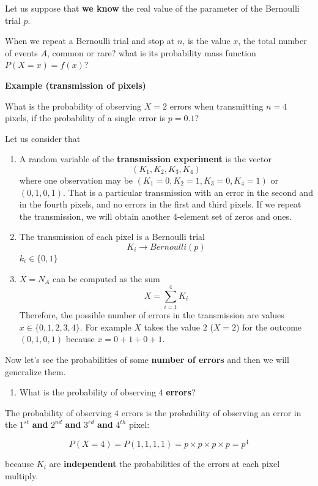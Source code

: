 \documentclass[
]{book}
\providecommand{\tightlist}{%
  \setlength{\itemsep}{0pt}\setlength{\parskip}{0pt}}
\begin{document}
Let us suppose that \textbf{we know} the real value of the parameter of the Bernoulli trial \(p\).

When we repeat a Bernoulli trial and stop at \(n\), is the value \(x\), the total number of events \(A\), common or rare? what is its probability mass function \(P(X=x)=f(x)\)?

\textbf{Example (transmission of pixels)}

What is the probability of observing \(X=2\) errors when transmitting \(n=4\) pixels, if the probability of a single error is \(p=0.1\)?

Let us consider that

\begin{enumerate}
\def\labelenumi{\arabic{enumi})}
\item
  A random variable of the \textbf{transmission experiment} is the vector \[(K_1, K_2, K_3, K_4)\] where one observation may be \((K_1=0, K_2=1, K_3=0, K_4=1)\) or \((0, 1, 0, 1)\). That is a particular transmission with an error in the second and in the fourth pixels, and no errors in the first and third pixels. If we repeat the transmission, we will obtain another 4-element set of zeros and ones.
\item
  The transmission of each pixel is a Bernoulli trial \[K_i \rightarrow Bernoulli(p)\] \(k_i \in \{0, 1\}\)
\item
  \(X=N_A\) can be computed as the sum \[X=\sum_{i=1}^4 K_i\] Therefore, the possible number of errors in the transmission are values \(x\in \{0,1,2,3,4\}\). For example \(X\) takes the value \(2\) (\(X=2\)) for the outcome \((0, 1, 0, 1)\) because \(x=0+1+0+1\).
\end{enumerate}

Now let's see the probabilities of some \textbf{number of errors} and then we will generalize them.

\begin{enumerate}
\def\labelenumi{\arabic{enumi})}
\tightlist
\item
  What is the probability of observing \(4\) \textbf{errors}?
\end{enumerate}

The probability of observing \(4\) errors is the probability of observing an error in the \(1^{st}\) \textbf{and} \(2^{nd}\) \textbf{and} \(3^{rd}\) \textbf{and} \(4^{th}\) pixel:

\[P(X=4)=P(1,1,1,1)=p\times p\times p\times p=p^4\]

because \(K_i\) are \textbf{independent} the probabilities of the errors at each pixel multiply.
\end{document}
